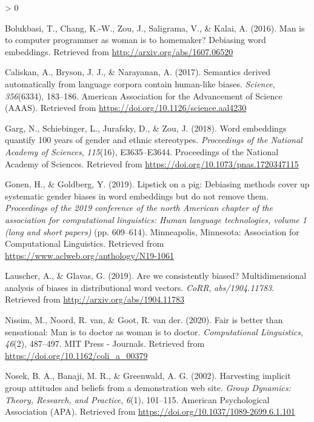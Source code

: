 \documentclass[
  10pt,
  dvipsnames,enabledeprecatedfontcommands]{scrartcl}
\newlength{\cslhangindent}
\newenvironment{CSLReferences}[2] %
 {%
  \setlength{\parindent}{0pt}
  \ifodd #1 \everypar{\setlength{\hangindent}{\cslhangindent}}\ignorespaces\fi
  \ifnum #2 > 0
  \setlength{\parskip}{#2\baselineskip}
  \fi
 }%
 {}
\begin{document}
\hypertarget{refs}{}
\begin{CSLReferences}{1}{0}
\leavevmode\hypertarget{ref-bolukbasi2016man}{}%
Bolukbasi, T., Chang, K.-W., Zou, J., Saligrama, V., \& Kalai, A.
(2016). Man is to computer programmer as woman is to homemaker?
Debiasing word embeddings. Retrieved from
\url{http://arxiv.org/abs/1607.06520}

\leavevmode\hypertarget{ref-Caliskan2017semanticsBiases}{}%
Caliskan, A., Bryson, J. J., \& Narayanan, A. (2017). Semantics derived
automatically from language corpora contain human-like biases.
\emph{Science}, \emph{356}(6334), 183--186. American Association for the
Advancement of Science ({AAAS}). Retrieved from
\url{https://doi.org/10.1126/science.aal4230}

\leavevmode\hypertarget{ref-Garg2018years}{}%
Garg, N., Schiebinger, L., Jurafsky, D., \& Zou, J. (2018). Word
embeddings quantify 100 years of gender and ethnic stereotypes.
\emph{Proceedings of the National Academy of Sciences}, \emph{115}(16),
E3635--E3644. Proceedings of the National Academy of Sciences. Retrieved
from \url{https://doi.org/10.1073/pnas.1720347115}

\leavevmode\hypertarget{ref-Gonen2019lipstick}{}%
Gonen, H., \& Goldberg, Y. (2019). Lipstick on a pig: {D}ebiasing
methods cover up systematic gender biases in word embeddings but do not
remove them. \emph{Proceedings of the 2019 conference of the north
{A}merican chapter of the association for computational linguistics:
Human language technologies, volume 1 (long and short papers)} (pp.
609--614). Minneapolis, Minnesota: Association for Computational
Linguistics. Retrieved from
\url{https://www.aclweb.org/anthology/N19-1061}

\leavevmode\hypertarget{ref-Lauscher2019multidimensional}{}%
Lauscher, A., \& Glavas, G. (2019). Are we consistently biased?
Multidimensional analysis of biases in distributional word vectors.
\emph{CoRR}, \emph{abs/1904.11783}. Retrieved from
\url{http://arxiv.org/abs/1904.11783}

\leavevmode\hypertarget{ref-Nissim2020fair}{}%
Nissim, M., Noord, R. van, \& Goot, R. van der. (2020). Fair is better
than sensational: Man is to doctor as woman is to doctor.
\emph{Computational Linguistics}, \emph{46}(2), 487--497. {MIT} Press -
Journals. Retrieved from \url{https://doi.org/10.1162/coli_a_00379}

\leavevmode\hypertarget{ref-Nosek2002harvesting}{}%
Nosek, B. A., Banaji, M. R., \& Greenwald, A. G. (2002). Harvesting
implicit group attitudes and beliefs from a demonstration web site.
\emph{Group Dynamics: Theory, Research, and Practice}, \emph{6}(1),
101--115. American Psychological Association ({APA}). Retrieved from
\url{https://doi.org/10.1037/1089-2699.6.1.101}

\end{CSLReferences}
\end{document}

